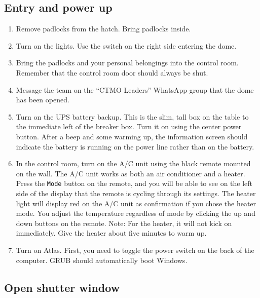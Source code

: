 \documentclass{article}
\begin{document}
	\subsection{Entry and power up}
	\label{sec:entry-and-power-up}
	
	\begin{enumerate}
		
		\item Remove padlocks from the hatch. Bring padlocks inside.
		
		\item Turn on the lights. Use the switch on the right side entering the dome.
		
		\item Bring the padlocks and your personal belongings into the control room. Remember that the control room door should always be shut.
		
		\item Message the team on the ``CTMO Leaders'' WhatsApp group that the dome has been opened.
		
		\item Turn on the UPS battery backup. This is the slim, tall box on the table to the immediate left of the breaker box. Turn it on using the center power button. After a beep and some warming up, the information screen should indicate the battery is running on the power line rather than on the battery.
		
		\item In the control room, turn on the A/C unit using the black remote mounted on the wall. The A/C unit works as both an air conditioner and a heater. Press the \texttt{Mode} button on the remote, and you will be able to see on the left side of the display that the remote is cycling through its settings. The heater light will display red on the A/C unit as confirmation if you chose the heater mode. You adjust the temperature regardless of mode by clicking the up and down buttons on the remote. Note: For the heater, it will not kick on immediately. Give the heater about five minutes to warm up.
		
		\item Turn on Atlas. First, you need to toggle the power switch on the back of the computer. GRUB should automatically boot Windows.
		
	\end{enumerate}
	
	\subsection{Open shutter window}
	\label{sec:open-shutter-window}
	
\end{document}
